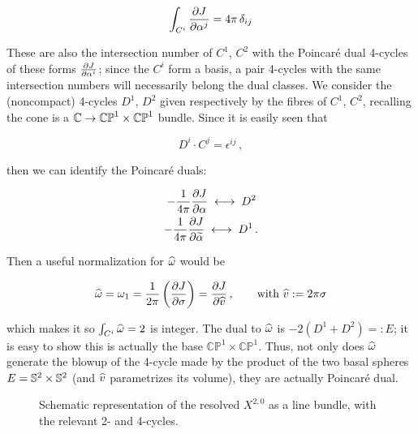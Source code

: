 \begin{equation}
	\int_{C^i} \frac{\partial J}{\partial\alpha^j} = 4\pi\, \delta_{ij}
	\label{}
\end{equation}


These are also the intersection number of $C^1$, $C^2$ with the Poincar\'e dual 4-cycles of these forms $\frac{\partial J}{\partial\alpha^i}$; since the $C^i$ form a basis, a pair 4-cycles with the same intersection numbers will necessarily belong the dual classes. We consider the (noncompact) 4-cycles $D^1$, $D^2$ given respectively by the fibres of $C^1$, $C^2$, recalling the cone is a $\mathbb{C}\rightarrow \mathbb{CP}^1 \times \mathbb{CP}^1$ bundle. Since it is easily seen that

\begin{equation}
	D^i \cdot C^j = \epsilon^{ij}	\,,
\end{equation}

then we can identify the Poincar\'e duals:

\begin{align}
	- \frac{1}{4\pi} \frac{\partial J}{\partial\alpha} \; \longleftrightarrow \; D^2 \, \\ - \frac{1}{4\pi}\frac{\partial J}{\partial\widetilde{\alpha}} \; \longleftrightarrow \; D^1\,.
	\label{}
\end{align}

Then a useful normalization for $\widehat{\omega}$ would be

\begin{align}
	\widehat{\omega} = \omega_1 = \frac{1}{2\pi}\left( \frac{\partial J}{\partial\sigma} \right) = \frac{\partial J}{\partial\widehat{v}}\,, \quad\quad \text{with } \widehat{v} := 2\pi \sigma
	\label{}
\end{align}

which makes it so $\int_{C^i} \widehat{\omega} = 2$ is integer. The dual to $\widehat{\omega} $ is $-2(D^1+D^2) =: E$; it is easy to show this is actually the base $\mathbb{CP}^1 \times \mathbb{CP}^1$. Thus, not only does $\widehat{\omega}$ generate the blowup of the 4-cycle made by the product of the two basal spheres $E = \mathbb{S}^2 \times \mathbb{S}^2 $ (and $\widehat{v}$ parametrizes its volume), they are actually Poincar\'e dual.

\begin{figure}[H]
\centering
\def\svgwidth{100pt}
\captionsetup{width=0.8\textwidth}

\caption{Schematic representation of the resolved $X^{2,0}$ as a line bundle, with the relevant 2- and 4-cycles.}
\end{figure}

